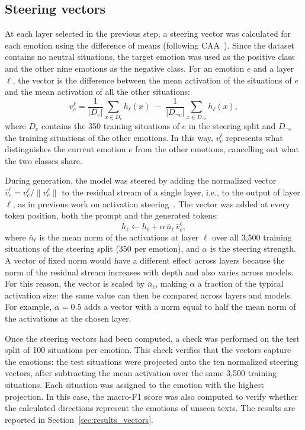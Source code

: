 \documentclass{article}
\begin{document}
\subsection{Steering vectors}
\label{sec:methods_vectors}
At each layer selected in the previous step, a steering vector was calculated for each emotion using the difference of means (following CAA~\cite{panickssery2024steerllama2}). Since the dataset contains no neutral situations, the target emotion was used as the positive class and the other nine emotions as the negative class. For an emotion $e$ and a layer $\ell$, the vector is the difference between the mean activation of the situations of $e$ and the mean activation of all the other situations:
\begin{equation}
v_e^{\ell} = \frac{1}{|D_e|} \sum_{x \in D_e} h_\ell(x) \;-\; \frac{1}{|D_{\neg e}|} \sum_{x \in D_{\neg e}} h_\ell(x),
\end{equation}
where $D_e$ contains the 350 training situations of $e$ in the steering split and $D_{\neg e}$ the training situations of the other emotions. In this way, $v_e^{\ell}$ represents what distinguishes the current emotion $e$ from the other emotions, cancelling out what the two classes share.

During generation, the model was steered by adding the normalized vector $\hat v_e^{\ell} = v_e^{\ell} / \|v_e^{\ell}\|$ to the residual stream of a single layer, i.e., to the output of layer $\ell$, as in previous work on activation steering~\cite{turner2024steeract, panickssery2024steerllama2, chen2025personavectors}. The vector was added at every token position, both the prompt and the generated tokens:
\begin{equation}
h_\ell \leftarrow h_\ell + \alpha \, \bar n_\ell \, \hat v_e^{\ell},
\end{equation}
where $\bar n_\ell$ is the mean norm of the activations at layer $\ell$ over all 3{,}500 training situations of the steering split (350 per emotion), and $\alpha$ is the steering strength. A vector of fixed norm would have a different effect across layers because the norm of the residual stream increases with depth and also varies across models. For this reason, the vector is scaled by $\bar n_\ell$, making $\alpha$ a fraction of the typical activation size: the same value can then be compared across layers and models. For example, $\alpha = 0.5$ adds a vector with a norm equal to half the mean norm of the activations at the chosen layer.

Once the steering vectors had been computed, a check was performed on the test split of 100 situations per emotion. This check verifies that the vectors capture the emotions: the test situations were projected onto the ten normalized steering vectors, after subtracting the mean activation over the same 3{,}500 training situations. Each situation was assigned to the emotion with the highest projection. In this case, the macro-F1 score was also computed to verify whether the calculated directions represent the emotions of unseen texts. The results are reported in Section~\ref{sec:results_vectors}.
\end{document}
